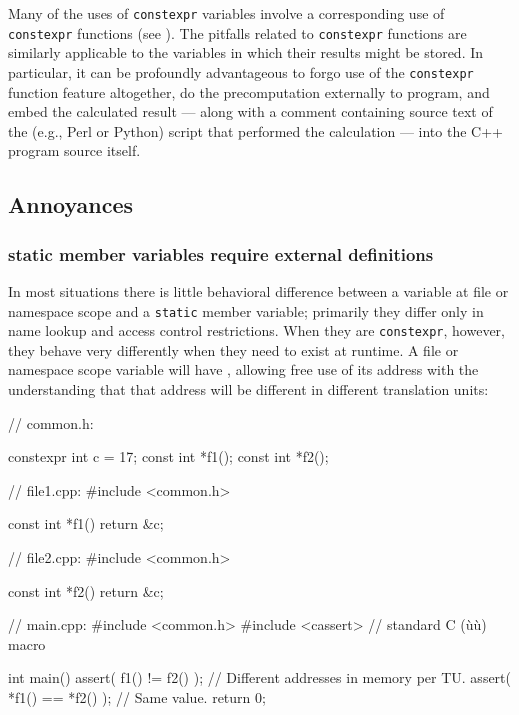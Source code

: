 Many of the uses of \lstinline!constexpr! variables involve a corresponding
use of \lstinline!constexpr! functions (see ). The pitfalls related to \lstinline!constexpr! functions are
similarly applicable to the variables in which their results might be
stored. In particular, it can be profoundly advantageous to forgo use of
the \lstinline!constexpr! function feature altogether, do the
precomputation externally to program, and embed the calculated result
--- along with a comment containing source text of the (e.g., Perl or
Python) script that performed the calculation --- into the C++ program
source itself.

\subsection[Annoyances]{Annoyances}\label{annoyances-constexprvar}

\subsubsection[\lstinline!static! member variables require external definitions]{{\SubsubsecCode static} member variables require external definitions}\label{static-member-variables-require-external-definitions}

In most situations there is little behavioral difference between a variable at file or namespace scope and a
\lstinline!static! member variable; primarily they differ only in name lookup and access control restrictions.
When they are \lstinline!constexpr!, however, they behave very differently when they need to exist
at runtime.  A file or namespace scope variable will have , allowing free use
of its address with the understanding that that address will be different in different translation units:

\begin{emcppslisting}
// common.h:

constexpr int c = 17;
const int *f1();
const int *f2();

// file1.cpp:
#include <common.h>

const int *f1() { return &c; }

// file2.cpp:
#include <common.h>

const int *f2() { return &c; }

// main.cpp:
#include <common.h>
#include <cassert>  // standard C (ù{}ù) macro

int main()
{
    assert( f1() != f2() );    // Different addresses in memory per TU.
    assert( *f1() == *f2() );  // Same value.
    return 0;
}
\end{emcppslisting}

